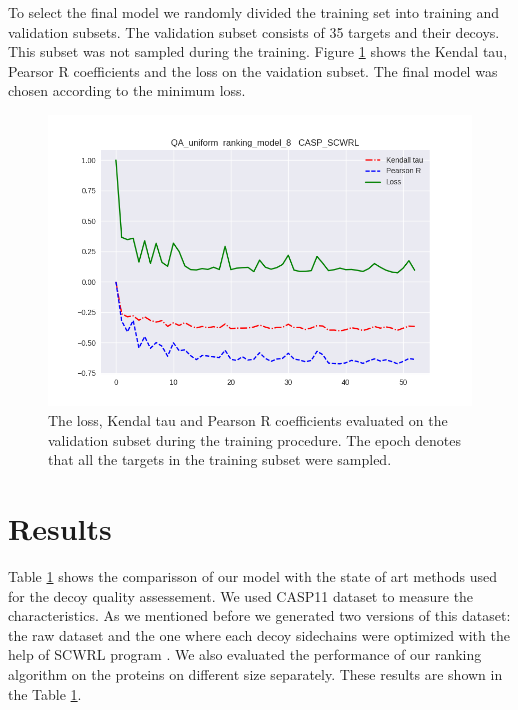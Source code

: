 \documentclass[a4paper,10pt]{article}
\begin{document}
To select the final model we randomly divided the training set into training and validation subsets. The validation subset consists of 
35 targets and their decoys. This subset was not sampled during the training. 
Figure \ref{} shows the Kendal tau, Pearsor R coefficients and the loss on the vaidation subset. The final model was chosen according to the 
minimum loss.
\begin{figure}[H]
    \centering
    \includegraphics[width=\linewidth]{Fig/kendall_validation.png}
    \caption{The loss, Kendal tau and Pearson R coefficients evaluated on the validation subset during the training procedure. The epoch 
    denotes that all the targets in the training subset were sampled.}
    \label{Fig:CNNModel}
\end{figure}


\section{Results}

Table \ref{} shows the comparisson of our model with the state of art methods used for the decoy quality assessement. We used CASP11 dataset to measure the 
characteristics. As we mentioned before we generated two versions of this dataset: the raw dataset and the one where each decoy sidechains were optimized with 
the help of SCWRL program \cite{}. We also evaluated the performance of our ranking algorithm on the proteins on different size separately. These results are shown 
in the Table \ref{}. 
\end{document}
